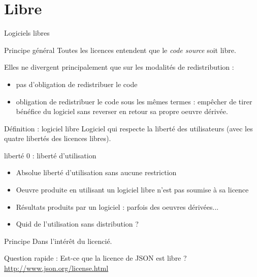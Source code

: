 \documentclass{beamer}
\begin{document}

\section{Libre}

\begin{frame}{Logiciels libres}

  \begin{alertblock}{Principe général}
    Toutes les licences entendent que le \textit{code source} soit libre.
  \end{alertblock}
  Elles ne divergent principalement que sur les modalités de redistribution :
  \begin{itemize}
  \item pas d'obligation de redistribuer le code
  \item obligation de redistribuer le code sous les mêmes termes : empêcher de tirer bénéfice du logiciel sans reverser en retour sa propre oeuvre dérivée.
  \end{itemize}

  \begin{alertblock}{Définition : logiciel libre}
    Logiciel qui respecte la liberté des utilisateurs (avec les quatre libertés des licences libres).    
  \end{alertblock}
  
\end{frame}


\begin{frame}{liberté 0 : liberté d'utilisation}
  \begin{itemize}
  \item Absolue liberté d'utilisation sans aucune restriction
  \item Oeuvre produite en utilisant un logiciel libre n'est pas
    soumise à sa licence
  \item Résultats produits par un logiciel : parfois des oeuvres
    dérivées...
  \item Quid de l'utilisation sans distribution ?
  \end{itemize}

  \begin{alertblock}{Principe}
    Dans l'intérêt du licencié.
  \end{alertblock}
  
  Question rapide : Est-ce que la licence de JSON est libre ? \url{http://www.json.org/license.html}

\end{frame}
\end{document}
